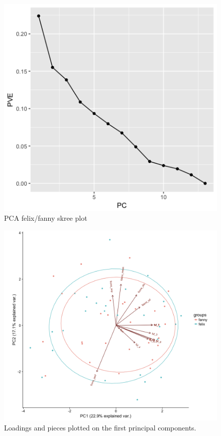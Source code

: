 \documentclass[12pt,twoside]{reedthesis}
\theoremstyle{definition}
\theoremstyle{definition}
\theoremstyle{definition}
\theoremstyle{remark}
\begin{document}
\begin{figure}[h]
\centering
\includegraphics[scale = .5]{images/fpca_skree.png}
\caption{PCA felix/fanny skree plot}
\label{subd}
\end{figure}
\begin{figure}[h]
\centering
\includegraphics[scale = .3]{images/ff_elipse12.png}
\caption{Loadings and pieces plotted on the first principal components. }
\label{subd}
\end{figure}
\end{document}
